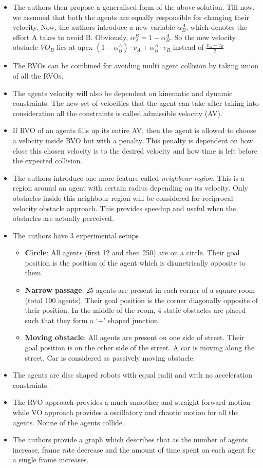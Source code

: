 \documentclass[12pt]{article}
\begin{document}
\begin{itemize}
    \item The authors then propose a generalised form of the above solution. Till now, we assumed that both the agents are equally responsible for changing their velocity. Now, the authors introduce a new variable $\alpha_B^A$, which denotes the effort A takes to avoid B. Obviously, $\alpha_A^B = 1 - \alpha_B^A$. So the new velocity obstacle $VO_B$ lies at apex $(1-\alpha^A_B) \cdot v_A + \alpha_B^A \cdot v_B$ instead of $\frac{v_A + v_B}{2}$
    \item The RVOs can be combined for avoiding multi agent collision by taking union of all the RVOs.
    \item The agents velocity will also be dependent on kinematic and dynamic constraints. The new set of velocities that the agent can take after taking into consideration all the constraints is called admissible velocity (AV).
    \item If RVO of an agents fills up its entire AV, then the agent is allowed to choose a velocity inside RVO but with a penalty. This penalty is dependent on how close this chosen velocity is to the desired velocity and how time is left before the expected collision.
    \item The authors introduce one more feature called \textit{neighbour region}. This is a region around an agent with certain radius depending on its velocity. Only obstacles inside this neighbour region will be considered for reciprocal velocity obstacle approach. This provides speedup and useful when the obstacles are actually perceived.
    \item The authors have 3 experimental setups
        \begin{itemize}
            \item \textbf{Circle}: All agents (first 12 and then 250) are on a circle. Their goal position is the position of the agent which is diametrically opposite to them.
            \item \textbf{Narrow passage}: 25 agents are present in each corner of a square room (total 100 agents). Their goal position is the corner diagonally opposite of their position. In the middle of the room, 4 static obstacles are placed such that they form a `+' shaped junction.
            \item \textbf{Moving obstacle}: All agents are present on one side of street. Their goal position is on the other side of the street. A car is moving along the street. Car is considered as passively moving obstacle.
        \end{itemize}
    \item The agents are disc shaped robots with equal radii and with no acceleration constraints.
    \item The RVO approach provides a much smoother and straight forward motion while VO approach provides a oscillatory and chaotic motion for all the agents. Nonne of the agents collide.
    \item The authors provide a graph which describes that as the number of agents increase, frame rate decrease and the amount of time spent on each agent for a single frame increases.
\end{itemize}
\end{document}
